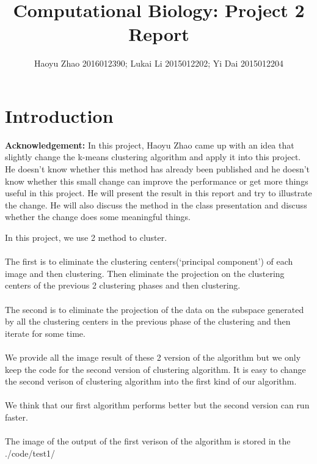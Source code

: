 \documentclass{article}
\title{\textbf{Computational Biology: Project 2 Report}}
\author[1]{Haoyu Zhao 2016012390;
  Lukai Li 2015012202;
  Yi Dai 2015012204}
\date{}
\begin{document}
\maketitle
\clearpage

\section{Introduction}
\textbf{Acknowledgement:} In this project, Haoyu Zhao came up with an idea that slightly change the k-means clustering algorithm and apply it into this project. He doesn't know whether this method has already been published and he doesn't know whether this small change can improve the performance or get more things useful in this project. He will present the result in this report and try to illustrate the change. He will also discuss the method in the class presentation and discuss whether the change does some meaningful things.\par

In this project, we use 2 method to cluster.\\
~\\
The first is to eliminate the clustering centers(`principal component') of each image and then clustering. Then eliminate the projection on the clustering centers of the previous 2 clustering phases and then clustering.\\
~\\
The second is to eliminate the projection of the data on the subspace generated by all the clustering centers in the previous phase of the clustering and then iterate for some time.\\
~\\
We provide all the image result of these 2 version of the algorithm but we only keep the code for the second version of clustering algorithm. It is easy to change the second verison of clustering algorithm into the first kind of our algorithm.\\
~\\
We think that our first algorithm performs better but the second version can run faster.\\
~\\
The image of the output of the first verison of the algorithm is stored in the ./code/test1/\\
\end{document}
